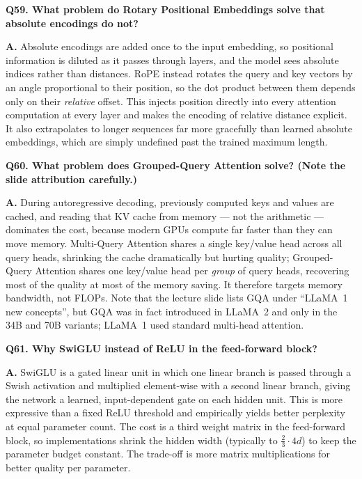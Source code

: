 \documentclass[11pt]{article}
\begin{document}
\medskip
\noindent\textbf{Q59. What problem do Rotary Positional Embeddings solve that absolute encodings do not?}

\noindent\textbf{A.} Absolute encodings are added once to the input embedding, so positional information is diluted as it passes through layers, and the model sees absolute indices rather than distances. RoPE instead rotates the query and key vectors by an angle proportional to their position, so the dot product between them depends only on their \emph{relative} offset. This injects position directly into every attention computation at every layer and makes the encoding of relative distance explicit. It also extrapolates to longer sequences far more gracefully than learned absolute embeddings, which are simply undefined past the trained maximum length.

\medskip
\noindent\textbf{Q60. What problem does Grouped-Query Attention solve? (Note the slide attribution carefully.)}

\noindent\textbf{A.} During autoregressive decoding, previously computed keys and values are cached, and reading that KV cache from memory --- not the arithmetic --- dominates the cost, because modern GPUs compute far faster than they can move memory. Multi-Query Attention shares a single key/value head across all query heads, shrinking the cache dramatically but hurting quality; Grouped-Query Attention shares one key/value head per \emph{group} of query heads, recovering most of the quality at most of the memory saving. It therefore targets memory bandwidth, not FLOPs. Note that the lecture slide lists GQA under ``LLaMA~1 new concepts'', but GQA was in fact introduced in LLaMA~2 and only in the 34B and 70B variants; LLaMA~1 used standard multi-head attention.

\medskip
\noindent\textbf{Q61. Why SwiGLU instead of ReLU in the feed-forward block?}

\noindent\textbf{A.} SwiGLU is a gated linear unit in which one linear branch is passed through a Swish activation and multiplied element-wise with a second linear branch, giving the network a learned, input-dependent gate on each hidden unit. This is more expressive than a fixed ReLU threshold and empirically yields better perplexity at equal parameter count. The cost is a third weight matrix in the feed-forward block, so implementations shrink the hidden width (typically to $\tfrac{2}{3}\cdot 4d$) to keep the parameter budget constant. The trade-off is more matrix multiplications for better quality per parameter.
\end{document}
